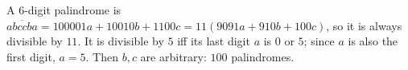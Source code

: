 A $6$-digit palindrome is $\overline{abccba}=100001a+10010b+1100c=11(9091a+910b+100c)$, so it is always divisible by $11$. It is divisible by $5$ iff its last digit $a$ is $0$ or $5$; since $a$ is also the first digit, $a=5$. Then $b,c$ are arbitrary: $\boxed{100}$ palindromes.
